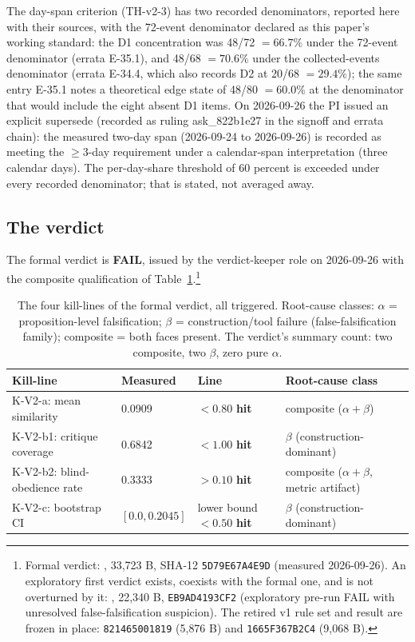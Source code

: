 \documentclass[11pt]{article}
\newcommand{\sha}[1]{\texttt{#1}}
\newcommand{\hit}{\textbf{hit}}
\begin{document}
The day-span criterion (TH-v2-3) has two recorded denominators, reported here with their sources, with the 72-event denominator declared as this paper's working standard: the D1 concentration was 48/72 $= 66.7\%$ under the 72-event denominator (errata E-35.1), and 48/68 $= 70.6\%$ under the collected-events denominator (errata E-34.4, which also records D2 at 20/68 $= 29.4\%$); the same entry E-35.1 notes a theoretical edge state of 48/80 $= 60.0\%$ at the denominator that would include the eight absent D1 items. On 2026-09-26 the PI issued an explicit supersede (recorded as ruling ask\_822b1e27 in the signoff and errata chain): the measured two-day span (2026-09-24 to 2026-09-26) is recorded as meeting the $\geq 3$-day requirement under a calendar-span interpretation (three calendar days). The per-day-share threshold of 60 percent is exceeded under every recorded denominator; that is stated, not averaged away.

\subsection{The verdict}

The formal verdict is \textbf{FAIL}, issued by the verdict-keeper role on 2026-09-26 with the composite qualification of Table~\ref{tab:killlines}.\footnote{Formal verdict: , 33{,}723 B, SHA-12 \sha{5D79E67A4E9D} (measured 2026-09-26). An exploratory first verdict exists, coexists with the formal one, and is not overturned by it: , 22{,}340 B, \sha{EB9AD4193CF2} (exploratory pre-run FAIL with unresolved false-falsification suspicion). The retired v1 rule set and result are frozen in place: \sha{821465001819} (5{,}876 B) and \sha{1665F367B2C4} (9{,}068 B).}

\begin{table}[htbp]
\centering
\begin{tabular}{llll}
\toprule
Kill-line & Measured & Line & Root-cause class \\
\midrule
K-V2-a: mean similarity & 0.0909 & $< 0.80$ \hit & composite ($\alpha + \beta$) \\
K-V2-b1: critique coverage & 0.6842 & $< 1.00$ \hit & $\beta$ (construction-dominant) \\
K-V2-b2: blind-obedience rate & 0.3333 & $> 0.10$ \hit & composite ($\alpha + \beta$, metric artifact) \\
K-V2-c: bootstrap CI & $[0.0, 0.2045]$ & lower bound $< 0.50$ \hit & $\beta$ (construction-dominant) \\
\bottomrule
\end{tabular}
\caption{The four kill-lines of the formal verdict, all triggered. Root-cause classes: $\alpha$ = proposition-level falsification; $\beta$ = construction/tool failure (false-falsification family); composite = both faces present. The verdict's summary count: two composite, two $\beta$, zero pure $\alpha$.}
\label{tab:killlines}
\end{table}
\end{document}
